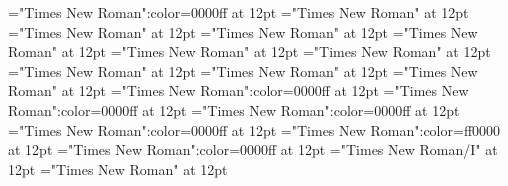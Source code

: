 \font\exampleusefirstoftypelastoftypesensearticlesectionletter="Times New Roman":color=0000ff at 12pt
\font\lastoftypevariantinflectionarticlesectionletter="Times New Roman" at 12pt
\font\variantinflectionarticlesectionletter="Times New Roman" at 12pt
\font\firstoftypevariantinflectionarticlesectionletter="Times New Roman" at 12pt
\font\firstoftypelastoftypestressfirstoftypelastoftypepronunciationarticlesectionletter="Times New Roman" at 12pt
\font\firstoftypelastoftypepronunciationarticlesectionletter="Times New Roman" at 12pt
\font\firstoftypeheadwordlastoftypearticlesectionletter="Times New Roman" at 12pt
\font\examplefirstoftypelastoftypesubentryarticlesectionletter="Times New Roman" at 12pt
\font\firstoftypeheadwordlastoftypefirstoftypelastoftypesubentryarticlesectionletter="Times New Roman" at 12pt
\font\firstoftypelastoftypesubentryarticlesectionletter="Times New Roman" at 12pt
\font\examplesensearticlesectionletter="Times New Roman":color=0000ff at 12pt
\font\firstoftypelastoftypewordusedefinitionfirstoftypelastoftypesensearticlesectionletter="Times New Roman":color=0000ff at 12pt
\font{}="Times New Roman":color=0000ff at 12pt
\font\firstoftypegrammarcategorylastoftypesensearticlesectionletter="Times New Roman":color=0000ff at 12pt
\font\sensebeforearticlesectionletter="Times New Roman":color=ff0000 at 12pt
\font\sensearticlesectionletter="Times New Roman":color=0000ff at 12pt
\font\articlesectionletter="Times New Roman/I" at 12pt
\font\sectionletter="Times New Roman" at 12pt

